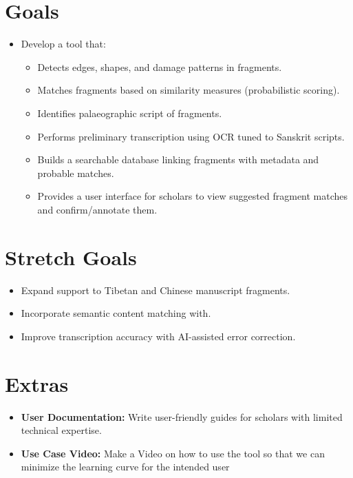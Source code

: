 \documentclass{article}
\begin{document}
\section{Goals}
\begin{itemize}
    \item Develop a tool that:
    \begin{itemize} 
        \item Detects edges, shapes, and damage patterns in fragments.
        \item Matches fragments based on similarity measures (probabilistic scoring).
        \item Identifies palaeographic script of fragments.
        \item Performs preliminary transcription using OCR tuned to Sanskrit scripts.
        \item Builds a searchable database linking fragments with metadata and probable matches.
        \item Provides a user interface for scholars to view suggested fragment matches and confirm/annotate them.
    \end{itemize}
\end{itemize}
\section{Stretch Goals}
\begin{itemize}
  \item Expand support to Tibetan and Chinese manuscript fragments.
  \item Incorporate semantic content matching with.
  \item Improve transcription accuracy with AI-assisted error correction.
\end{itemize}

\section{Extras}
\begin{itemize}
  \item \textbf{User Documentation:} Write user-friendly guides for scholars with limited technical expertise.
  \item \textbf{Use Case Video:} Make a Video on how to use the tool so that we can minimize the learning curve for the intended user
\end{itemize}

\end{document}
